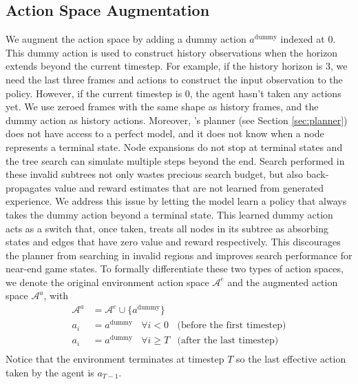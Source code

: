 \subsection{Action Space Augmentation} \label{sec:a_aug}
We augment the action space by adding a dummy action $a^\text{dummy}$ indexed at 0.
This dummy action is used to construct history observations when the horizon extends beyond the current timestep.
For example, if the history horizon is 3, we need the last three frames and actions to construct the input observation to the policy.
However, if the current timestep is 0, the agent hasn't taken any actions yet.
We use zeroed frames with the same shape as history frames, and the dummy action as history actions.
Moreover, \moozi's planner (see Section \ref{sec:planner}) does not have access to a perfect model, and it does not know when a node represents a terminal state.
Node expansions do not stop at terminal states and the tree search can simulate multiple steps beyond the end.
Search performed in these invalid subtrees not only wastes precious search budget, but also back-propagates value and reward estimates that are not learned from generated experience.
We address this issue by letting the model learn a policy that always takes the dummy action beyond a terminal state.
This learned dummy action acts as a switch that, once taken, treats all nodes in its subtree as absorbing states and edges that have zero value and reward respectively.
This discourages the planner from searching in invalid regions and improves search performance for near-end game states.
To formally differentiate these two types of action spaces, we denote the original environment action space $\mathcal{A}^e$ and the augmented action space $\mathcal{A}^a$, with
\begin{align*}
    \mathcal{A}^a  & = \mathcal{A}^e \cup \lbrace a^\text{dummy} \rbrace  \\
    a_{i}          & = a^\text{dummy} ~~~~ \forall i < 0                  & \text{(before the first timestep)}  \\
    a_{i}          & = a^\text{dummy} ~~~~ \forall i \geq T               & \text{(after the last timestep)}  \\
\end{align*}
Notice that the environment terminates at timestep $T$ so the last effective action taken by the agent is $a_{T-1}$.

